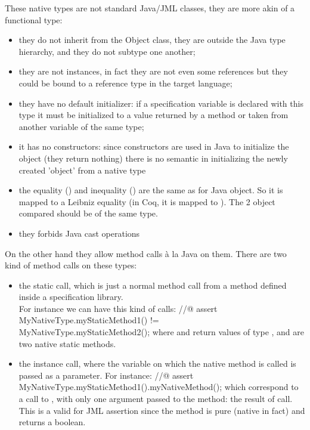 These native types are not standard Java/JML classes, they are more akin of a functional type:
\begin{itemize}
\item they do not inherit from the Object class, 
they are outside the Java type hierarchy, and they do not
subtype one another;
\item they are not instances, in fact they are not even some references but 
they could be bound to a reference type in the target language;
\item they have no default initializer: 
if a specification variable is declared with this type it must
be initialized to a value returned by a method or taken from 
another variable of the same type;
\item it has no constructors: since constructors are used in Java to 
initialize the object (they return nothing) there is no semantic in 
initializing the newly created 'object' from a native type
\item the equality (\code{==}) and inequality (\code{!=}) are the
same as for Java object. So it is mapped to a Leibniz
equality (in Coq, it is mapped to ). The 2 object compared
should be of the same type.
\item they forbids Java cast operations
\end{itemize}
On the other hand they allow method calls \`a la Java on them. 
There are two kind of method calls on these types:
\begin {itemize}
\item the static call, which is just a normal method call from a 
method defined inside a specification library.\\
For instance we can have this kind of calls:
\btab
//@ assert MyNativeType.my\=StaticMethod1() !=\\ \>MyNativeType.myStaticMethod2();
\etab
where  and   return  values of type , 
and are two native static methods.
\item the instance call, where the variable on which the native method is called is passed as a 
parameter. For instance:
\btab
//@ assert MyNativeType.myStaticMethod1().myNativeMethod();
\etab
which correspond to a call to , with only one argument passed to the method: the
result of  call. This is a valid for JML assertion since the method 
 is
pure (native in fact) and returns a boolean.
\end{itemize}

